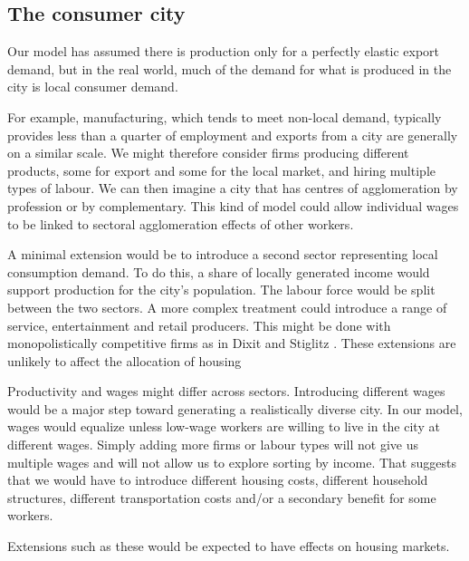 

\subsection{The consumer city}
Our model has assumed there is production only for a perfectly elastic export demand, but in the real world, much of the demand for what is produced in the city is local consumer demand. 
{\color{red} For example, manufacturing, which tends to meet non-local demand, typically provides less than a quarter of employment and exports from a city are generally on a similar scale. 
We might therefore consider firms producing different products, some for export and some for the local market, and hiring multiple types of labour. We can then imagine a city that has centres of agglomeration by profession or by complementary. This kind of model could allow individual wages to be linked to sectoral agglomeration effects of other workers. %

A minimal extension would be to introduce a second sector representing local consumption demand. To do this, a share of locally generated income would support production for the city's population. The labour force would be split between the two sectors. A more complex treatment could introduce a range of service, entertainment and retail producers. This might be done with monopolistically competitive firms as in Dixit and Stiglitz \cite{AvinashK.Dixit1977MCaO}. These extensions are unlikely to affect the allocation of housing

Productivity and wages might differ across sectors. 
Introducing different wages would be a major step toward generating a realistically diverse city. In our model, wages would equalize unless low-wage workers are willing to live in the city at different wages. Simply adding more firms or labour types will not give us multiple wages and will not allow us to explore sorting by income. That suggests that we would have to introduce different housing costs, different household structures, different transportation costs and/or a secondary benefit for some workers.  } Extensions such as these would be expected to have effects on housing markets. %

